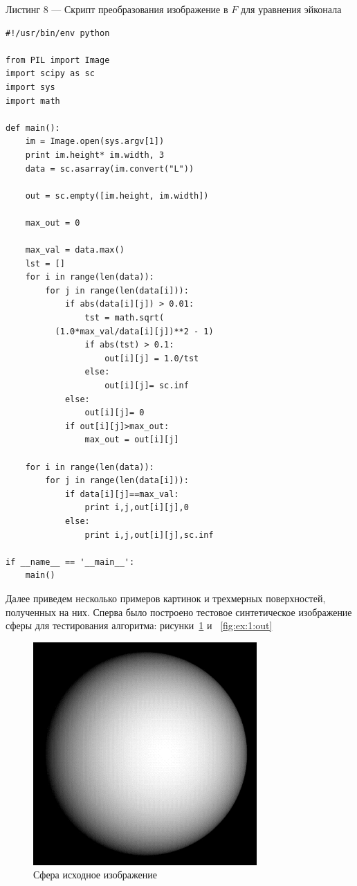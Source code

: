 \documentclass[a4paper,12pt]{article}
\begin{document}
\vspace{1em} Листинг 8 --- Скрипт преобразования изображение в $F$ для
уравнения эйконала \normalsize
\begin{verbatim}
#!/usr/bin/env python

from PIL import Image
import scipy as sc
import sys
import math

def main():
    im = Image.open(sys.argv[1])
    print im.height* im.width, 3
    data = sc.asarray(im.convert("L"))

    out = sc.empty([im.height, im.width])

    max_out = 0
    
    max_val = data.max()
    lst = []
    for i in range(len(data)):
        for j in range(len(data[i])):
            if abs(data[i][j]) > 0.01:
                tst = math.sqrt(
          (1.0*max_val/data[i][j])**2 - 1)
                if abs(tst) > 0.1:
                    out[i][j] = 1.0/tst
                else:
                    out[i][j]= sc.inf
            else:
                out[i][j]= 0
            if out[i][j]>max_out:
                max_out = out[i][j]

    for i in range(len(data)):
        for j in range(len(data[i])):
            if data[i][j]==max_val:
                print i,j,out[i][j],0
            else:
                print i,j,out[i][j],sc.inf

if __name__ == '__main__':
    main()
\end{verbatim}
\large

Далее приведем несколько примеров картинок и трехмерных поверхностей,
полученных на них. Сперва было построено тестовое синтетическое
изображение сферы для тестирования алгоритма: рисунки~\ref{fig:ex:1:in} 
и ~\ref{fig:ex:1:out}

\begin{figure}[H]
  \centering
  \includegraphics[width=0.5\linewidth]{sphere_in.png}
  \hfil \caption{Сфера исходное изображение}
  \label{fig:ex:1:in}
\end{figure}
\end{document}
